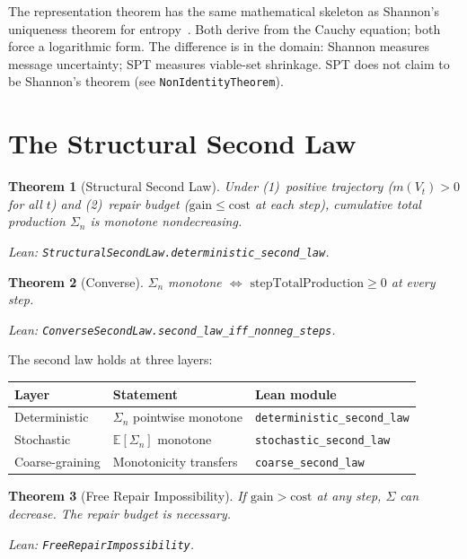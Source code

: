 \documentclass[11pt,a4paper]{article}
\newtheorem{theorem}{Theorem}
\begin{document}
The representation theorem has the same mathematical skeleton as Shannon's uniqueness theorem for entropy~\cite{shannon1948}. Both derive from the Cauchy equation; both force a logarithmic form. The difference is in the domain: Shannon measures message uncertainty; SPT measures viable-set shrinkage. SPT does not claim to be Shannon's theorem (see \texttt{NonIdentityTheorem}).

\section{The Structural Second Law}
\label{sec:secondlaw}

\begin{theorem}[Structural Second Law]
Under (1)~positive trajectory ($m(V_t)>0$ for all $t$) and (2)~repair budget ($\mathrm{gain}\leq\mathrm{cost}$ at each step), cumulative total production $\Sigma_n$ is monotone nondecreasing.

Lean: \texttt{StructuralSecondLaw.deterministic\_second\_law}.
\end{theorem}

\begin{theorem}[Converse]
$\Sigma_n$ monotone $\iff$ $\mathrm{stepTotalProduction}\geq 0$ at every step.

Lean: \texttt{ConverseSecondLaw.second\_law\_iff\_nonneg\_steps}.
\end{theorem}

The second law holds at three layers:

\begin{center}
\begin{tabular}{lll}
\toprule
Layer & Statement & Lean module \\
\midrule
Deterministic & $\Sigma_n$ pointwise monotone & \texttt{deterministic\_second\_law} \\
Stochastic & $\mathbb{E}[\Sigma_n]$ monotone & \texttt{stochastic\_second\_law} \\
Coarse-graining & Monotonicity transfers & \texttt{coarse\_second\_law} \\
\bottomrule
\end{tabular}
\end{center}

\begin{theorem}[Free Repair Impossibility]
If $\mathrm{gain}>\mathrm{cost}$ at any step, $\Sigma$ can decrease. The repair budget is necessary.

Lean: \texttt{FreeRepairImpossibility}.
\end{theorem}
\end{document}
